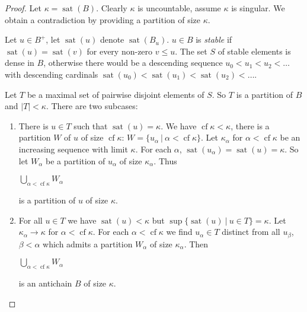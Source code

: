\documentclass[8pt]{article}
\theoremstyle{definition}
\theoremstyle{definition}
\theoremstyle{definition}
\theoremstyle{definition}
\theoremstyle{definition}
\theoremstyle{definition}
\theoremstyle{definition}
\theoremstyle{definition}
\theoremstyle{definition}
\theoremstyle{definition}
\theoremstyle{definition}
\theoremstyle{definition}
\theoremstyle{definition}
\theoremstyle{definition}
\theoremstyle{question}
\begin{document}
\begin{proof}
  Let $\kappa = \operatorname{sat}(B)$. Clearly $\kappa$ is uncountable, assume $\kappa$ is singular. We obtain
  a contradiction by providing a partition of size $\kappa$.

  Let $u \in B^+$, let $\operatorname{sat}(u)$ denote $\operatorname{sat}(B_u)$.
  $u \in B$ is \emph{stable} if $\operatorname{sat}(u) = \operatorname{sat}(v)$ for every non-zero $v \leq u$.
  The set $S$ of stable elements is dense in $B$, otherwise there would be a descending sequence 
  $u_0 < u_1 < u_2 < \dots$ with descending cardinals 
  $\operatorname{sat}(u_0) < \operatorname{sat}(u_1) < \operatorname{sat}(u_2) < \dots$.

  Let $T$ be a maximal set of pairwise disjoint elements of $S$. So $T$ is a partition of $B$ and $|T| < \kappa$.
  There are two subcases:
  \begin{enumerate}
    \item There is $u \in T$ such that $\operatorname{sat}(u) = \kappa$. We have
    $\operatorname{cf} \kappa < \kappa$, there is a partition $W$ of $u$ of size 
    $\operatorname{cf} \kappa$: $W = \{ u_{\alpha} \: | \: \alpha < \operatorname{cf} \kappa \}$.
    Let $\kappa_{\alpha}$ for $\alpha < \operatorname{cf} \kappa$ be an increasing sequence with limit $\kappa$.
    For each $\alpha$, $\operatorname{sat}(u_{\alpha}) = \operatorname{sat}(u) = \kappa$. 
    So let $W_{\alpha}$ be a partition of $u_{\alpha}$ of size $\kappa_{\alpha}$. Thus 
    \begin{center}
      $\bigcup \limits_{\alpha < \operatorname{cf} \kappa} W_{\alpha}$
    \end{center}
    is a partition of $u$ of size $\kappa$.
    \item For all $u \in T$ we have $\operatorname{sat}(u) < \kappa$ but $\sup \{ \operatorname{sat}(u) \: | \: u \in T\} = \kappa$.
    Let $\kappa_{\alpha} \to \kappa$ for $\alpha < \operatorname{cf} \kappa$.
    For each $\alpha < \operatorname{cf} \kappa$ we find $u_{\alpha} \in T$ distinct from all $u_{\beta}$,
    $\beta < \alpha$ which admits a partition $W_{\alpha}$ of size $\kappa_{\alpha}$.
    Then
    \begin{center}
      $\bigcup \limits_{\alpha < \operatorname{cf} \kappa} W_{\alpha}$
    \end{center}
    is an antichain $B$ of size $\kappa$.
  \end{enumerate}
\end{proof}
\end{document}
